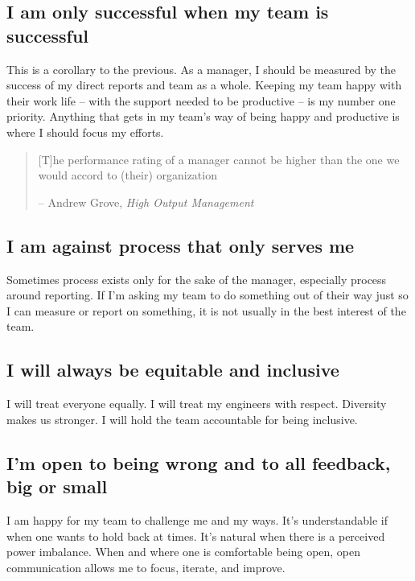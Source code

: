 \documentclass[11pt]{amsart}
\begin{document}
\subsection{I am only successful when my team is successful}
This is a corollary to the previous. As a manager, I should be measured by the success of my direct reports and team as a whole. Keeping my team  happy with their work life -- with the support needed to be productive -- is my number one priority. Anything that gets in my team's way of being happy and productive is where I should focus my efforts.

\begin{quote}
[T]he performance rating of a manager cannot be higher than the one we would accord to (their) organization

-- Andrew Grove, \emph{High Output Management}
\end{quote}

\subsection{I am against process that only serves me}
Sometimes process exists only for the sake of the manager, especially process around reporting. If I’m asking my team to do something out of their way just so I can measure or report on something, it is not usually in the best interest of the team.

\subsection{I will always be equitable and inclusive}
I will treat everyone equally. I will treat my engineers with respect. Diversity makes us stronger. I will hold the team accountable for being inclusive. 

\subsection{I'm open to being wrong and to all feedback, big or small}
I am happy for my team to challenge me and my ways. It’s understandable if when one wants to hold back at times. It’s natural when there is a perceived power imbalance. When and where one is comfortable being open, open communication allows me to focus, iterate, and improve.

\end{document}
